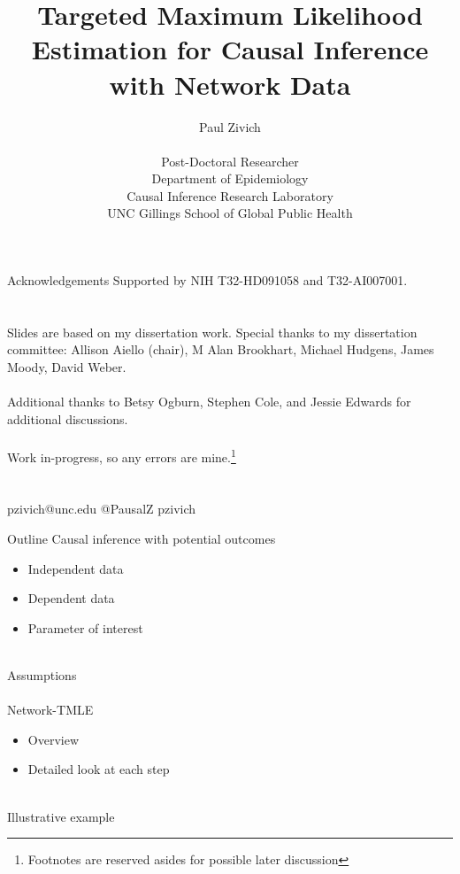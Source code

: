 \documentclass{beamer}
\title[TMLE for Network Data]{Targeted Maximum Likelihood Estimation for Causal Inference with Network Data}
\author[Paul Zivich]{Paul Zivich \\~\\ Post-Doctoral Researcher \\ Department of Epidemiology \\ Causal Inference Research Laboratory \\ UNC Gillings School of Global Public Health}
\begin{document}
\begin{frame}[plain]
    \maketitle
\end{frame}

\begin{frame}{Acknowledgements}
	Supported by NIH T32-HD091058 and T32-AI007001.\\~\\~\\
	
	Slides are based on my dissertation work. Special thanks to my dissertation committee: Allison Aiello (chair), M Alan Brookhart, Michael Hudgens, James Moody, David Weber.\\~\\
	Additional thanks to Betsy Ogburn, Stephen Cole, and Jessie Edwards for additional discussions.\\~\\
	
	Work in-progress, so any errors are mine.\footnote[frame]{Footnotes are reserved asides for possible later discussion}\\~\\~\\
	
	\faEnvelope \quad pzivich@unc.edu \qquad \quad
	\faTwitter \quad @PausalZ \qquad \quad
	\faGithub \quad pzivich\\
\end{frame}

\begin{frame}{Outline}
	Causal inference with potential outcomes
	\begin{itemize}
		\item Independent data
		\item Dependent data
		\item Parameter of interest
	\end{itemize}~\\
	Assumptions\\~\\
	Network-TMLE
	\begin{itemize}
		\item Overview
		\item Detailed look at each step
	\end{itemize}~\\
	Illustrative example
\end{frame}
\end{document}
